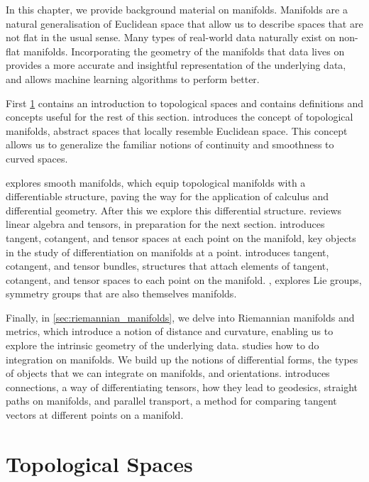 In this chapter, we provide background material on manifolds.
Manifolds are a natural generalisation of Euclidean space that allow us to describe spaces that are not flat in the usual sense.
Many types of real-world data naturally exist on non-flat manifolds. 
Incorporating the geometry of the manifolds that data lives on provides a more accurate and insightful representation of the underlying data, and allows machine learning algorithms to perform better.

First \cref{sec:topological_spaces} contains an introduction to topological spaces and contains definitions and concepts useful for the rest of this section.
 introduces the concept of topological manifolds, abstract spaces that locally resemble Euclidean space. 
This concept allows us to generalize the familiar notions of continuity and smoothness to curved spaces.

 explores smooth manifolds, which equip topological manifolds with a differentiable structure, paving the way for the application of calculus and differential geometry.
After this we explore this differential structure.
 reviews linear algebra and tensors, in preparation for the next section.
 introduces tangent, cotangent, and tensor spaces at each point on the manifold, key objects in the study of differentiation on manifolds at a point.
 introduces tangent, cotangent, and tensor bundles, structures that attach elements of tangent, cotangent, and tensor spaces to each point on the manifold.
, explores Lie groups, symmetry groups that are also themselves manifolds.

Finally, in \cref{sec:riemannian_manifolds}, we delve into Riemannian manifolds and metrics, which introduce a notion of distance and curvature, enabling us to explore the intrinsic geometry of the underlying data.
 studies how to do integration on manifolds. We build up the notions of differential forms, the types of objects that we can integrate on manifolds, and orientations.
 introduces connections, a way of differentiating tensors, how they lead to geodesics, straight paths on manifolds, and parallel transport, a method for comparing tangent vectors at different points on a manifold.

\section{Topological Spaces}
\label{sec:topological_spaces}

